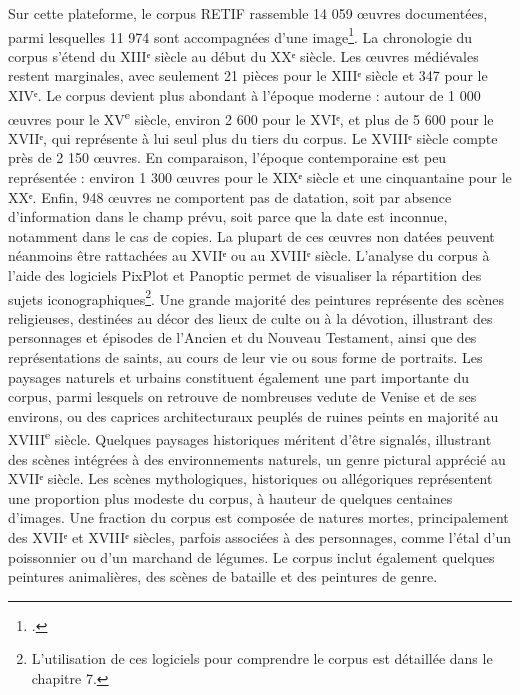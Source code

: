 Sur cette plateforme, le corpus RETIF rassemble 14 059 œuvres documentées, parmi lesquelles 11 974 sont accompagnées d’une image\footcite{institutnationaldhistoiredelartRepertoireTableauxItaliens}. La chronologie du corpus s’étend du XIIIᵉ siècle au début du XXᵉ siècle. Les œuvres médiévales restent marginales, avec seulement 21 pièces pour le XIIIᵉ siècle et 347 pour le XIVᵉ. Le corpus devient plus abondant à l’époque moderne : autour de 1 000 œuvres pour le XV\textsuperscript{e} siècle, environ 2 600 pour le XVIᵉ, et plus de 5 600 pour le XVIIᵉ, qui représente à lui seul plus du tiers du corpus. Le XVIIIᵉ siècle compte près de 2 150 œuvres. En comparaison, l’époque contemporaine est peu représentée : environ 1 300 œuvres pour le XIXᵉ siècle et une cinquantaine pour le XXᵉ. Enfin, 948 œuvres ne comportent pas de datation, soit par absence d’information dans le champ prévu, soit parce que la date est inconnue, notamment dans le cas de copies. La plupart de ces œuvres non datées peuvent néanmoins être rattachées au XVIIᵉ ou au XVIIIᵉ siècle. L’analyse du corpus à l’aide des logiciels PixPlot et Panoptic permet de visualiser la répartition des sujets iconographiques\footnote{L’utilisation de ces logiciels pour comprendre le corpus est détaillée dans le chapitre 7.}. Une grande majorité des peintures représente des scènes religieuses, destinées au décor des lieux de culte ou à la dévotion, illustrant des personnages et épisodes de l’Ancien et du Nouveau Testament, ainsi que des représentations de saints, au cours de leur vie ou sous forme de portraits. Les paysages naturels et urbains constituent également une part importante du corpus, parmi lesquels on retrouve de nombreuses vedute de Venise et de ses environs, ou des caprices architecturaux peuplés de ruines peints en majorité au XVIII\textsuperscript{e} siècle. Quelques paysages historiques méritent d’être signalés, illustrant des scènes intégrées à des environnements naturels, un genre pictural apprécié au XVIIᵉ siècle. Les scènes mythologiques, historiques ou allégoriques représentent une proportion plus modeste du corpus, à hauteur de quelques centaines d’images. Une fraction du corpus est composée de natures mortes, principalement des XVIIᵉ et XVIIIᵉ siècles, parfois associées à des personnages, comme l’étal d’un poissonnier ou d’un marchand de légumes. Le corpus inclut également quelques peintures animalières, des scènes de bataille et des peintures de genre.

